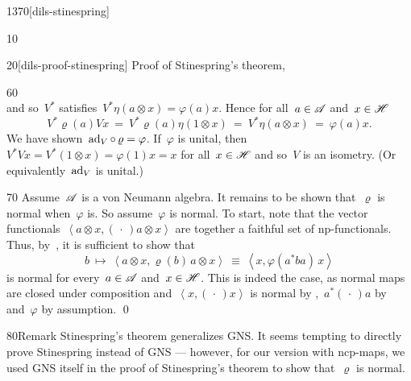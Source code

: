 \begin{parsec}{1370}[dils-stinespring]
\begin{point}{10}
\begin{point}{20}[dils-proof-stinespring]{%
    Proof of Stinespring's theorem, }
\begin{point}{60}
\begin{equation*}
\end{equation*}
    and so~$V^*$ satisfies~$V^* \eta(a \otimes x) = \varphi(a)x$.
    Hence for all~$a \in \mathscr{A}$ and~$x \in \mathscr{H}$
\begin{equation*}
    V^* \varrho(a) V x
        \ =\  V^* \varrho(a) \eta(1 \otimes x)
        \ =\  V^* \eta(a\otimes x)
        \ =\  \varphi(a)x.
\end{equation*}
We have shown~$\mathrm{ad}_V \mathop{\circ} \varrho = \varphi$.
    If~$\varphi$ is unital,
    then~$V^*Vx = V^* (1\otimes x) = \varphi(1)x=x$
        for all~$x \in \mathscr{H}$ and so~$V$ is an isometry.
    (Or equivalently~$\mathrm{ad}_V$ is unital.)
\end{point}
\begin{point}{70}%
Assume~$\mathscr{A}$ is a von Neumann algebra.
It remains to be shown that~$\varrho$
    is normal when~$\varphi$ is.
So assume~$\varphi$ is normal.
To start, note that
    the vector functionals~$\left< a\otimes x, (\,\cdot\,) a\otimes x\right>$
    are together a faithful set of np-functionals.
Thus, by~,
    it is sufficient
    to show that
\begin{equation*}
    b \ \mapsto \ \left<a \otimes x, \varrho(b) \, a \otimes x \right>
    \ \equiv \ \left<x, \varphi(a^* b a) \,x \right>
\end{equation*}
    is normal for every~$a\in \mathscr{A}$ and~$x \in \mathscr{H}$.
    This is indeed the case, as normal
    maps are closed under composition and~$\left<x, (\,\cdot\,) x\right>$
    is normal by ,~$a^* (\,\cdot\,) a$ by 
    and~$\varphi$ by assumption.
        \qed
\end{point}
\end{point}
\begin{point}{80}{Remark}%
Stinespring's theorem generalizes GNS.
It seems tempting to directly prove Stinespring instead of GNS ---
however, for our version with ncp-maps,
we used GNS itself in the proof of Stinespring's theorem to show
that~$\varrho$ is normal.
\end{point}
\end{point}
\end{parsec}

